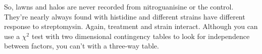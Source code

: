 So, lawns and halos are never recorded from nitroguanisine or the 
control. They're nearly always found with histidine and different 
strains have different response to streptomysin. Again, treatment and 
strain interact. Although you can use a $\chi^2$ test with two 
dimensional contingency tables to look for independence between 
factors, you can't with a three-way table. 
